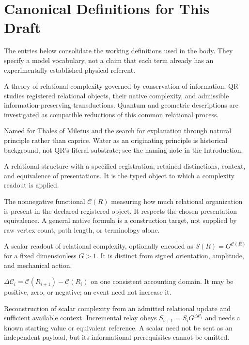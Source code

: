 \section{Canonical Definitions for This Draft}
\label{app:definitions}
The entries below consolidate the working definitions used in the body. They specify a model vocabulary, not a claim that each term already has an experimentally established physical referent.

\begin{description}[style=nextline,leftmargin=1.5em,font=\normalfont\bfseries]
\item[Quantum Relativity]
A theory of relational complexity governed by conservation of information. QR studies registered relational objects, their native complexity, and admissible information-preserving transductions. Quantum and geometric descriptions are investigated as compatible reductions of this common relational process.
\item[Thalean]
Named for Thales of Miletus and the search for explanation through natural principle rather than caprice. Water as an originating principle is historical background, not QR's literal substrate; see the naming note in the Introduction.
\item[Registered relational object]
A relational structure with a specified registration, retained distinctions, context, and equivalence of presentations. It is the typed object to which a complexity readout is applied.
\item[Relational complexity]
The nonnegative functional $\mathcal C(R)$ measuring how much relational organization is present in the declared registered object. It respects the chosen presentation equivalence. A general native formula is a construction target, not supplied by raw vertex count, path length, or terminology alone.
\item[Scalar]
A scalar readout of relational complexity, optionally encoded as $S(R)=G^{\mathcal C(R)}$ for a fixed dimensionless $G>1$. It is distinct from signed orientation, amplitude, and mechanical action.
\item[Complexity increment]
$\Delta\mathcal C_i=\mathcal C(R_{i+1})-\mathcal C(R_i)$ on one consistent accounting domain. It may be positive, zero, or negative; an event need not increase it.
\item[Scalar relay]
Reconstruction of scalar complexity from an admitted relational update and sufficient available context. Incremental relay obeys $S_{i+1}=S_iG^{\Delta\mathcal C_i}$ and needs a known starting value or equivalent reference. A scalar need not be sent as an independent payload, but its informational prerequisites cannot be omitted.

\end{description}
